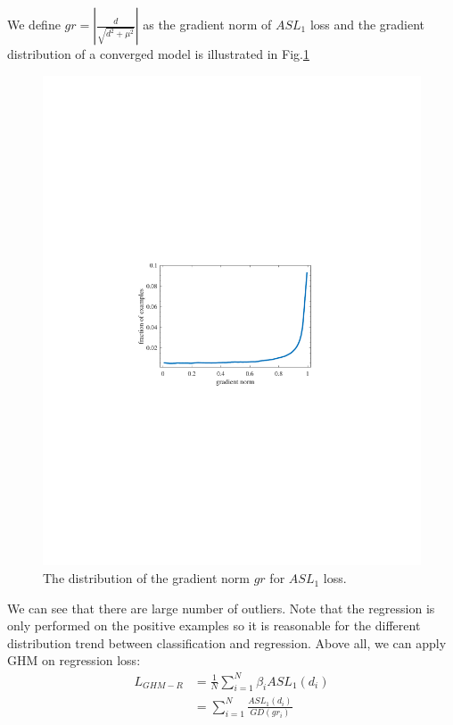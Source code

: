 \documentclass[letterpaper]{article} %
\begin{document}
We define $gr = |\frac{d}{\sqrt{d^2 + \mu^2}}|$ as the gradient norm of $ASL_1$ loss and the gradient distribution of a converged model is illustrated in Fig.\ref{fig:reg_dist}
\begin{figure}[ht]
\centering
\includegraphics[width=0.8\linewidth]{figs/reg_dist}
\caption{The distribution of the gradient norm $gr$ for $ASL_1$ loss.}
\label{fig:reg_dist}
\end{figure}
We can see that there are large number of outliers. Note that the regression is only performed on the positive examples so it is reasonable for the different distribution trend between classification and regression. Above all, we can apply  GHM on regression loss:
\begin{equation}
\label{eq:ghm-r}
    \begin{aligned}
    L_{GHM-R} &= \frac{1}{N}\sum_{i=1}^N\beta_i ASL_1(d_i) \\
    &= \sum_{i=1}^N\frac{ASL_1(d_i)}{GD(gr_i)}
    \end{aligned}
\end{equation}
\end{document}
